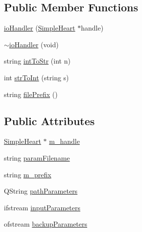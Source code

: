 \subsection*{Public Member Functions}
\begin{DoxyCompactItemize}
\item 
\hyperlink{classio_handler_aa57cd18c3ae379dbc508d2942ee553fa}{io\+Handler} (\hyperlink{class_simple_heart}{Simple\+Heart} $\ast$handle)
\item 
\hyperlink{classio_handler_a030878327dcdc71c410e2b3184538aed}{$\sim$io\+Handler} (void)
\item 
string \hyperlink{classio_handler_a7d65ecb912b15cbeff8ecaa3f3a33f7b}{int\+To\+Str} (int n)
\item 
int \hyperlink{classio_handler_a24088c5418729764793ad2ff055d4de8}{str\+To\+Int} (string s)
\item 
string \hyperlink{classio_handler_aaf8038bd0ff5a184504cf4622411fd51}{file\+Prefix} ()
\end{DoxyCompactItemize}
\subsection*{Public Attributes}
\begin{DoxyCompactItemize}
\item 
\hyperlink{class_simple_heart}{Simple\+Heart} $\ast$ \hyperlink{classio_handler_a69a16636ea31e6b2c16a447cc69c9d40}{m\+\_\+handle}
\item 
string \hyperlink{classio_handler_aa997341357b4da444f481ab43f455f9b}{param\+Filename}
\item 
string \hyperlink{classio_handler_a80e45be220c886422df536b4714e4b94}{m\+\_\+prefix}
\item 
Q\+String \hyperlink{classio_handler_a18b3ace510b075e81a08a4a3ed9d00a2}{path\+Parameters}
\item 
ifstream \hyperlink{classio_handler_a9eb908a81637ccd23846b8722f89a3c3}{input\+Parameters}
\item 
ofstream \hyperlink{classio_handler_a3dde6edac5ac86c95b1651faafd8b418}{backup\+Parameters}
\end{DoxyCompactItemize}


